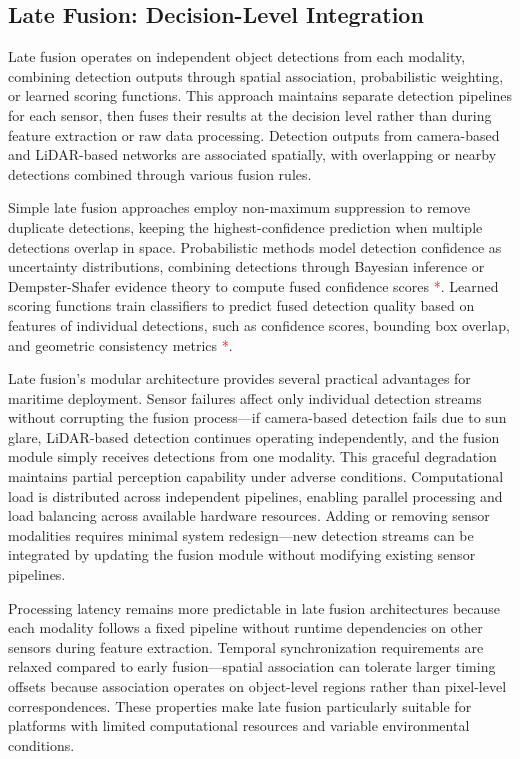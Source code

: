 \documentclass[../main.tex]{subfiles}
\begin{document}
\subsection{Late Fusion: Decision-Level Integration}

Late fusion operates on independent object detections from each modality, combining detection outputs through spatial association, probabilistic weighting, or learned scoring functions. This approach maintains separate detection pipelines for each sensor, then fuses their results at the decision level rather than during feature extraction or raw data processing. Detection outputs from camera-based and LiDAR-based networks are associated spatially, with overlapping or nearby detections combined through various fusion rules.

Simple late fusion approaches employ non-maximum suppression to remove duplicate detections, keeping the highest-confidence prediction when multiple detections overlap in space. Probabilistic methods model detection confidence as uncertainty distributions, combining detections through Bayesian inference or Dempster-Shafer evidence theory to compute fused confidence scores \textcolor{red}{*}. Learned scoring functions train classifiers to predict fused detection quality based on features of individual detections, such as confidence scores, bounding box overlap, and geometric consistency metrics \textcolor{red}{*}.

Late fusion's modular architecture provides several practical advantages for maritime deployment. Sensor failures affect only individual detection streams without corrupting the fusion process—if camera-based detection fails due to sun glare, LiDAR-based detection continues operating independently, and the fusion module simply receives detections from one modality. This graceful degradation maintains partial perception capability under adverse conditions. Computational load is distributed across independent pipelines, enabling parallel processing and load balancing across available hardware resources. Adding or removing sensor modalities requires minimal system redesign—new detection streams can be integrated by updating the fusion module without modifying existing sensor pipelines.

Processing latency remains more predictable in late fusion architectures because each modality follows a fixed pipeline without runtime dependencies on other sensors during feature extraction. Temporal synchronization requirements are relaxed compared to early fusion—spatial association can tolerate larger timing offsets because association operates on object-level regions rather than pixel-level correspondences. These properties make late fusion particularly suitable for platforms with limited computational resources and variable environmental conditions.
\end{document}
